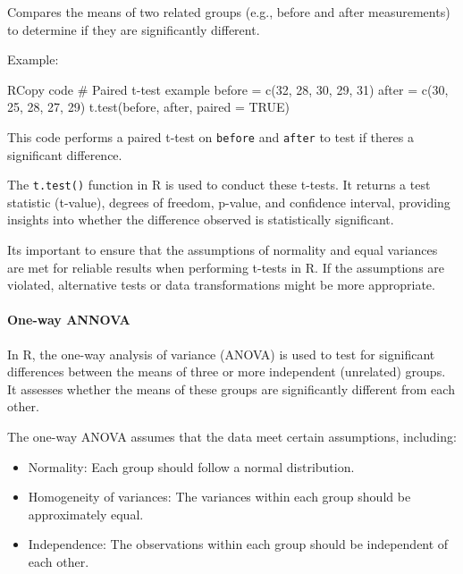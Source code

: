 \documentclass[
]{article}
\newenvironment{Shaded}{}{}
\newcommand{\NormalTok}[1]{#1}
\begin{document}
\begin{enumerate}
  Compares the means of two related groups (e.g., before and after
  measurements) to determine if they are significantly different.

  Example:

\begin{Shaded}
\begin{Highlighting}[]
\NormalTok{RCopy code}
\NormalTok{\# Paired t{-}test example}
\NormalTok{before = c(32, 28, 30, 29, 31)}
\NormalTok{after = c(30, 25, 28, 27, 29)}
\NormalTok{t.test(before, after, paired = TRUE)}
\end{Highlighting}
\end{Shaded}

  This code performs a paired t-test on \texttt{before} and
  \texttt{after} to test if there\textquotesingle s a significant
  difference.
\end{enumerate}

The \texttt{t.test()} function in R is used to conduct these t-tests. It
returns a test statistic (t-value), degrees of freedom, p-value, and
confidence interval, providing insights into whether the difference
observed is statistically significant.

It\textquotesingle s important to ensure that the assumptions of
normality and equal variances are met for reliable results when
performing t-tests in R. If the assumptions are violated, alternative
tests or data transformations might be more appropriate.

\hypertarget{one-way-annova}{%
\paragraph{One-way ANNOVA}\label{one-way-annova}}

In R, the one-way analysis of variance (ANOVA) is used to test for
significant differences between the means of three or more independent
(unrelated) groups. It assesses whether the means of these groups are
significantly different from each other.

The one-way ANOVA assumes that the data meet certain assumptions,
including:

\begin{itemize}
\item
  Normality: Each group should follow a normal distribution.
\item
  Homogeneity of variances: The variances within each group should be
  approximately equal.
\item
  Independence: The observations within each group should be independent
  of each other.
\end{itemize}
\end{document}
